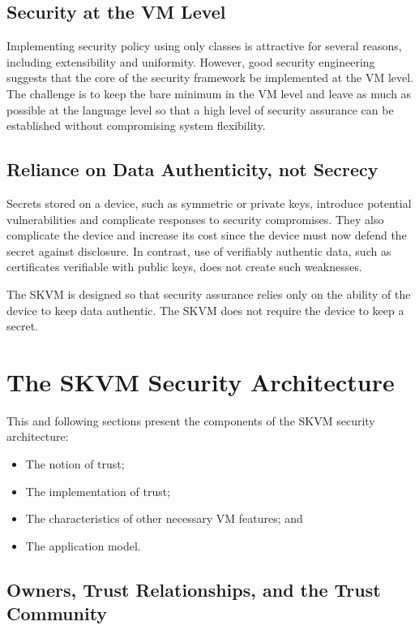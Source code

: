 \documentclass{llncs}
\begin{document}
\subsection{Security at the VM Level}

Implementing security policy using only classes is attractive for
several reasons, including extensibility and uniformity. However,
good security engineering suggests that the core of the security
framework be implemented at the VM level. The challenge is to keep
the bare minimum in the VM level and leave as much as possible at
the language level so that a high level of security assurance can
be established without compromising system flexibility.

\subsection{Reliance on Data Authenticity, not Secrecy}

Secrets stored on a device, such as symmetric or private keys,
introduce potential vulnerabilities and complicate responses to
security compromises. They also complicate the device and increase
its cost since the device must now defend the secret against
disclosure. In contrast, use of verifiably authentic data, such as
certificates verifiable with public keys, does not create such
weaknesses.

The SKVM is designed so that security assurance relies only on the
ability of the device to keep data authentic. The SKVM does not
require the device to keep a secret.

\section{The SKVM Security Architecture}

This and following sections present the components of the SKVM
security architecture:
\begin{itemize}
  \item The notion of trust;
  \item The implementation of trust;
  \item The characteristics of other necessary VM features; and
  \item The application model.
\end{itemize}

\subsection{Owners, Trust Relationships, and the Trust Community}
\end{document}
